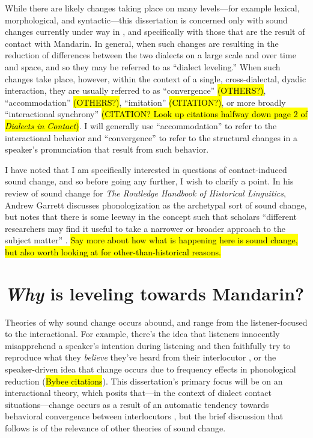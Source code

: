     While there are likely changes taking place on many levels---for example lexical, morphological, and syntactic---this dissertation is concerned only with sound changes currently under way in \ND{}, and specifically with those that are the result of contact with Mandarin. In general, when such changes are resulting in the reduction of differences between the two dialects on a large scale and over time and space, and so they may be referred to as ``dialect leveling.'' When such changes take place, however, within the context of a single, cross-dialectal, dyadic interaction, they are usually referred to as ``convergence'' \citep{giles1973accent} \hl{(OTHERS?)}, ``accommodation'' \citep{trudgill1986dialects} \hl{(OTHERS?)}, ``imitation'' \hl{(CITATION?)}, or more broadly ``interactional synchrony'' \hl{(CITATION? Look up citations halfway down page 2 of \textit{Dialects in Contact})}. I will generally use ``accommodation'' to refer to the interactional behavior and ``convergence'' to refer to the structural changes in a speaker's pronunciation that result from such behavior.
     
    I have noted that I am specifically interested in questions of contact-induced sound change, and so before going any further, I wish to clarify a point. In his review of sound change for \textit{The Routledge Handbook of Historical Linguitics}, Andrew Garrett discusses phonologization as the archetypal sort of sound change, but notes that there is some leeway in the concept such that scholars ``different researchers may find it useful to take a narrower or broader approach to the subject matter'' \citeyearpar[p.232]{garret2015sound}. \hl{Say more about how what is happening here is sound change, but also worth looking at for other-than-historical reasons.}

\section{\emph{Why} is \ND{} leveling towards Mandarin?}
    Theories of why sound change occurs abound, and range from the listener-focused to the interactional. For example, there's the idea that listeners innocently misapprehend a speaker's intention during listening and then faithfully try to reproduce what they \emph{believe} they've heard from their interlocutor \citep{ohala1981listener,ohala1989sound}, or the speaker-driven idea that change occurs due to frequency effects in phonological reduction (\hl{Bybee citations}). This dissertation's primary focus will be on an interactional theory, which posits that---in the context of dialect contact situations---change occurs as a result of an automatic tendency towards behavioral convergence between interlocutors \citep{trudgill1986dialects,auer2005role}, but the brief discussion that follows is of the relevance of other theories of sound change.
    
